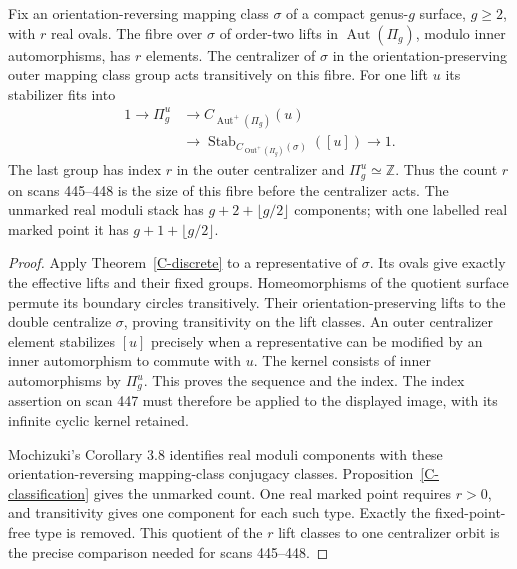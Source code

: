 \begin{proposition}
\label{C-moduli-count}
Fix an orientation-reversing mapping class $\sigma$
of a compact genus-$g$ surface, $g\geq2$, with
$r$ real ovals. The fibre over $\sigma$ of
order-two lifts in $\operatorname{Aut}(\Pi_g)$,
modulo inner automorphisms, has $r$ elements.
The centralizer of $\sigma$ in the
orientation-preserving outer mapping class
group acts transitively on this fibre.
For one lift $u$ its stabilizer fits into
\[
\begin{split}
 1\longrightarrow\Pi_g^u
 &\longrightarrow C_{\operatorname{Aut}^{+}(\Pi_g)}(u)\\
 &\longrightarrow
 \operatorname{Stab}_{C_{\operatorname{Out}^{+}(\Pi_g)}(\sigma)}
       ([u])\longrightarrow1.
\end{split}
\]
The last group has index $r$ in the outer centralizer
and $\Pi_g^u\simeq\mathbb Z$.
Thus the count $r$ on scans 445--448 is the size of
this fibre before the centralizer acts.
The unmarked real moduli stack has
$g+2+\lfloor g/2\rfloor$ components; with one
labelled real marked point it has
$g+1+\lfloor g/2\rfloor$.
\end{proposition}
\begin{proof}
Apply Theorem~\ref{C-discrete} to a representative
of $\sigma$. Its ovals give exactly the effective
lifts and their fixed groups. Homeomorphisms of the
quotient surface permute its boundary circles
transitively. Their orientation-preserving lifts
to the double centralize $\sigma$, proving
transitivity on the lift classes.
An outer centralizer element stabilizes $[u]$
precisely when a representative can be modified
by an inner automorphism to commute with $u$.
The kernel consists of inner automorphisms by
$\Pi_g^u$. This proves the sequence and the
index. The index assertion on scan 447 must
therefore be applied to the displayed image,
with its infinite cyclic kernel retained.

Mochizuki's Corollary 3.8 identifies real moduli
components with these orientation-reversing
mapping-class conjugacy classes.
Proposition~\ref{C-classification} gives the
unmarked count. One real marked point requires
$r>0$, and transitivity gives one component
for each such type. Exactly the fixed-point-free
type is removed. This quotient of the $r$ lift
classes to one centralizer orbit is the
precise comparison needed for scans 445--448.
\end{proof}

